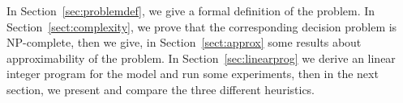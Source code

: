 In Section~\ref{sec:problemdef}, we give a formal definition of the problem. In Section~\ref{sect:complexity}, we prove that the corresponding decision problem is NP-complete, then we give, in Section~\ref{sect:approx} some results about approximability of the problem. In Section~\ref{sec:linearprog} we derive an linear integer program for the model and run some experiments, then in the next section, we present and compare the three different heuristics.
